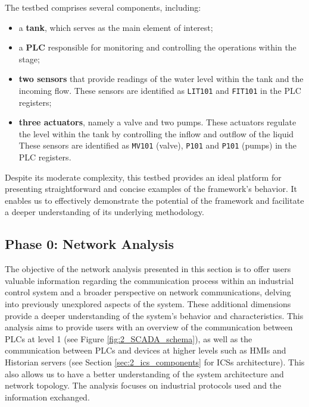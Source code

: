 \bigskip
The testbed comprises several components, including:

\begin{itemize}
	\item a \textbf{tank}, which serves as the main element of interest;
	
	\item a \textbf{PLC} responsible for monitoring and controlling the operations within the stage;
	
	\item \textbf{two sensors} that provide readings of the water level within the tank and the incoming flow. These sensors are identified as \texttt{LIT101} and \texttt{FIT101} in the PLC registers;
	
	\item \textbf{three actuators}, namely a valve and two pumps. These actuators regulate the level within the tank by controlling the inflow and outflow of the liquid These sensors are identified as \texttt{MV101} (valve), \texttt{P101} and \texttt{P101} (pumps) in the PLC registers.
\end{itemize}

Despite its moderate complexity, this testbed provides an ideal platform for presenting straightforward and concise examples of the framework's behavior. It enables us to effectively demonstrate the potential of the framework and facilitate a deeper understanding of its underlying methodology.

\subsection{Phase 0: Network Analysis}
\label{subsec:4_network_analysis}
The objective of the network analysis presented in this section is to offer users valuable information regarding the communication process within an industrial control system and a broader perspective on network communications, delving into previously unexplored aspects of the system. These additional dimensions provide a deeper understanding of the system's behavior and characteristics. This analysis aims to provide users with an overview of the communication between PLCs at level 1 (see Figure \ref{fig:2_SCADA_schema}), as well as the communication between PLCs and devices at higher levels such as HMIs and Historian servers (see Section \ref{sec:2_ics_components} for ICSs architecture). This also allows us to have a better understanding of the system architecture and network topology. The analysis focuses on industrial protocols used and the information exchanged.

